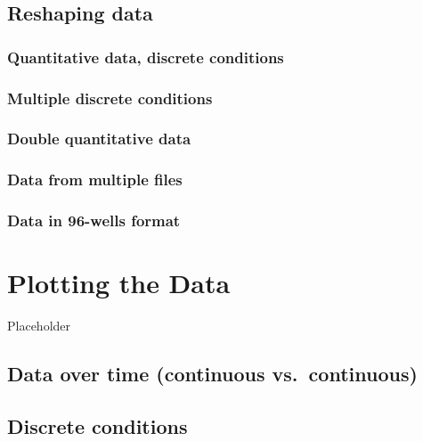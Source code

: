 \documentclass[
]{book}
\begin{document}
\hypertarget{tidy-data}{%
\section{Reshaping data}\label{tidy-data}}

\hypertarget{quantitative-data-discrete-conditions}{%
\subsection{Quantitative data, discrete conditions}\label{quantitative-data-discrete-conditions}}

\hypertarget{multiple-discrete-conditions}{%
\subsection{Multiple discrete conditions}\label{multiple-discrete-conditions}}

\hypertarget{double-quantitative-data}{%
\subsection{Double quantitative data}\label{double-quantitative-data}}

\hypertarget{data-from-multiple-files}{%
\subsection{Data from multiple files}\label{data-from-multiple-files}}

\hypertarget{data-in-96-wells-format}{%
\subsection{Data in 96-wells format}\label{data-in-96-wells-format}}

\hypertarget{plotting-the-data}{%
\chapter{Plotting the Data}\label{plotting-the-data}}

Placeholder

\hypertarget{data-over-time-continuous-vs.-continuous}{%
\section{Data over time (continuous vs.~continuous)}\label{data-over-time-continuous-vs.-continuous}}

\hypertarget{discrete-conditions}{%
\section{Discrete conditions}\label{discrete-conditions}}
\end{document}
